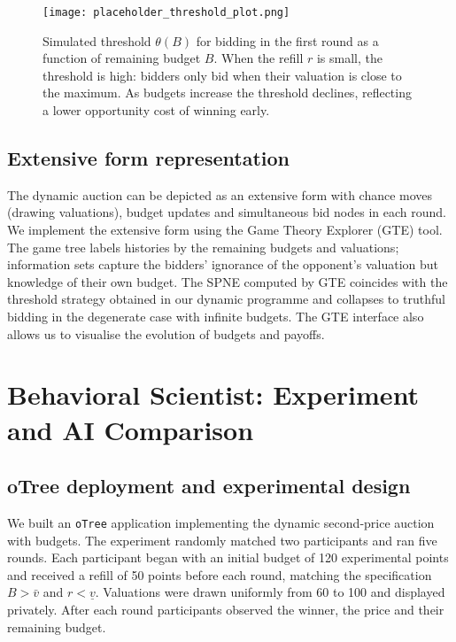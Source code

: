 \begin{figure}[H]
    \centering
    \texttt{[image: placeholder\_threshold\_plot.png]}
    \caption{Simulated threshold \(\theta(B)\) for bidding in the first round as a function of remaining budget \(B\).  When the refill \(r\) is small, the threshold is high: bidders only bid when their valuation is close to the maximum.  As budgets increase the threshold declines, reflecting a lower opportunity cost of winning early.}
    \label{fig:thresholds}
\end{figure}


\subsection{Extensive form representation}
The dynamic auction can be depicted as an extensive form with chance moves (drawing valuations), budget updates and simultaneous bid nodes in each round.  We implement the extensive form using the Game Theory Explorer (GTE) tool.  The game tree labels histories by the remaining budgets and valuations; information sets capture the bidders’ ignorance of the opponent’s valuation but knowledge of their own budget.  The SPNE computed by GTE coincides with the threshold strategy obtained in our dynamic programme and collapses to truthful bidding in the degenerate case with infinite budgets.  The GTE interface also allows us to visualise the evolution of budgets and payoffs.

\section{Behavioral Scientist: Experiment and AI Comparison}
\label{sec:behaviour}

\subsection{oTree deployment and experimental design}
We built an \texttt{oTree} application implementing the dynamic second‑price auction with budgets.  The experiment randomly matched two participants and ran five rounds.  Each participant began with an initial budget of 120 experimental points and received a refill of 50 points before each round, matching the specification \(B>\bar{v}\) and \(r<\underline{v}\).  Valuations were drawn uniformly from 60 to 100 and displayed privately.  After each round participants observed the winner, the price and their remaining budget.


